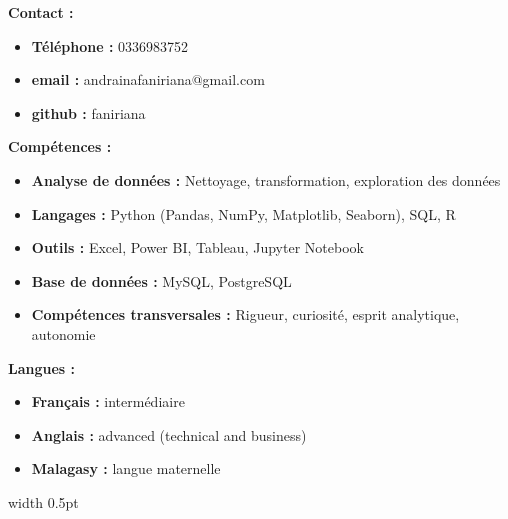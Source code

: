 \documentclass[a4paper,12pt]{article}
\begin{document}
\noindent
\begin{minipage}{0.48\textwidth}
    \raggedright
    \textbf{Contact :}
    \begin{itemize}
    \renewcommand\labelitemi{$\bullet$}
    \item \textbf{Téléphone : }0336983752
    \item \textbf{email : }andrainafaniriana@gmail.com
    \item \textbf{github : }faniriana
    \end{itemize}
    
    \vspace{0.3cm}
    \textbf{Compétences :}
    \begin{itemize}
    \renewcommand\labelitemi{$\bullet$}
    \item \textbf{Analyse de données : }Nettoyage, transformation, exploration des données
    \item \textbf{Langages : }Python (Pandas, NumPy, Matplotlib, Seaborn), SQL, R
    \item \textbf{Outils : }Excel, Power BI, Tableau, Jupyter Notebook
    \item \textbf{Base de données : }MySQL, PostgreSQL
    \item \textbf{Compétences transversales : }Rigueur, curiosité, esprit analytique, autonomie
    \end{itemize}
    
    \vspace{0.3cm}
    \textbf{Langues :}
    \begin{itemize}
    \renewcommand\labelitemi{$\bullet$}
    \item \textbf{Français : } intermédiaire
    \item \textbf{Anglais : } advanced (technical and business)
    \item \textbf{Malagasy : } langue maternelle
    \end{itemize}
\end{minipage}
\hfill
\vrule width 0.5pt
\hfill
\end{document}
